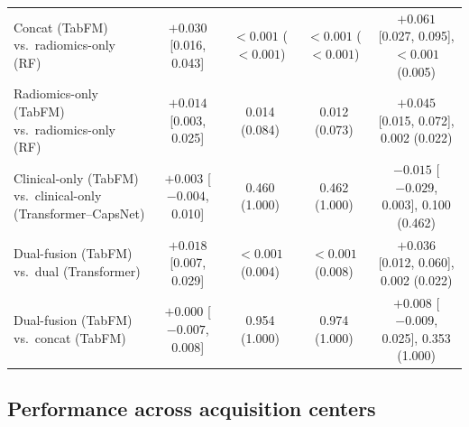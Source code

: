 \documentclass[11pt]{article}
\begin{document}
\begin{table}[!htbp]
{\begin{tabular}{lcccc}
Concat (TabFM) vs.\ radiomics-only (RF) & $+0.030$ [0.016, 0.043] & $<0.001$ ($<0.001$) & $<0.001$ ($<0.001$) & $+0.061$ [0.027, 0.095], $<0.001$ (0.005) \\
Radiomics-only (TabFM) vs.\ radiomics-only (RF) & $+0.014$ [0.003, 0.025] & 0.014 (0.084) & 0.012 (0.073) & $+0.045$ [0.015, 0.072], 0.002 (0.022) \\
Clinical-only (TabFM) vs.\ clinical-only (Transformer--CapsNet) & $+0.003$ [$-0.004$, 0.010] & 0.460 (1.000) & 0.462 (1.000) & $-0.015$ [$-0.029$, 0.003], 0.100 (0.462) \\
Dual-fusion (TabFM) vs.\ dual (Transformer) & $+0.018$ [0.007, 0.029] & $<0.001$ (0.004) & $<0.001$ (0.008) & $+0.036$ [0.012, 0.060], 0.002 (0.022) \\
Dual-fusion (TabFM) vs.\ concat (TabFM) & $+0.000$ [$-0.007$, 0.008] & 0.954 (1.000) & 0.974 (1.000) & $+0.008$ [$-0.009$, 0.025], 0.353 (1.000) \\
\bottomrule
\end{tabular}
}
\end{table}

\subsection{Performance across acquisition centers}
\label{sec:res-center}
\end{document}
